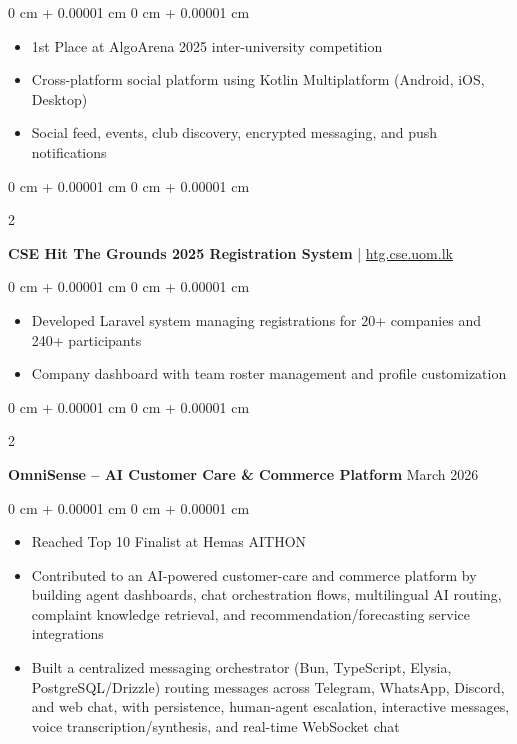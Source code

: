 \documentclass[10pt, letterpaper]{article}
\newenvironment{highlights}{
    \begin{itemize}[
        topsep=0.10 cm,
        parsep=0.10 cm,
        partopsep=0pt,
        itemsep=0pt,
        leftmargin=0 cm + 10pt
    ]
}{
    \end{itemize}
} %
\newenvironment{onecolentry}{
    \begin{adjustwidth}{
        0 cm + 0.00001 cm
    }{
        0 cm + 0.00001 cm
    }
}{
    \end{adjustwidth}
} %
\newenvironment{twocolentry}[2][]{
    \onecolentry
    \def\secondColumn{#2}
    \setcolumnwidth{\fill, 4.5 cm}
    \begin{paracol}{2}
}{
    \switchcolumn \raggedleft \secondColumn
    \end{paracol}
    \endonecolentry
} %
\let\hrefWithoutArrow\href
\begin{document}
        \vspace{0.10 cm}
        \begin{onecolentry}
            \begin{highlights}
                \item 1st Place at AlgoArena 2025 inter-university competition
                \item Cross-platform social platform using Kotlin Multiplatform (Android, iOS, Desktop)
                \item Social feed, events, club discovery, encrypted messaging, and push notifications
            \end{highlights}
        \end{onecolentry}

        \vspace{0.30 cm}
        \begin{twocolentry}{
            2025
        }
            \textbf{CSE Hit The Grounds 2025 Registration System} | \hrefWithoutArrow{https://htg.cse.uom.lk}{htg.cse.uom.lk}\end{twocolentry}

        \vspace{0.10 cm}
        \begin{onecolentry}
            \begin{highlights}
                \item Developed Laravel system managing registrations for 20+ companies and 240+ participants
                \item Company dashboard with team roster management and profile customization
            \end{highlights}
        \end{onecolentry}

        \vspace{0.30 cm}
        \begin{twocolentry}{
            March 2026
        }
            \textbf{OmniSense – AI Customer Care \& Commerce Platform}\end{twocolentry}

        \vspace{0.10 cm}
        \begin{onecolentry}
            \begin{highlights}
                \item Reached Top 10 Finalist at Hemas AITHON
                \item Contributed to an AI-powered customer-care and commerce platform by building agent dashboards, chat orchestration flows, multilingual AI routing, complaint knowledge retrieval, and recommendation/forecasting service integrations
                \item Built a centralized messaging orchestrator (Bun, TypeScript, Elysia, PostgreSQL/Drizzle) routing messages across Telegram, WhatsApp, Discord, and web chat, with persistence, human-agent escalation, interactive messages, voice transcription/synthesis, and real-time WebSocket chat
            \end{highlights}
        \end{onecolentry}
\end{document}
